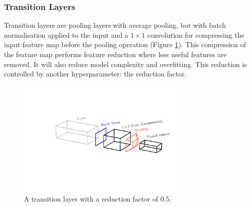 \subsubsection{Transition Layers}
Transition layers are pooling layers with average pooling, but with batch normalisation applied to the input and a $1\times{}1$ convolution for compressing the input feature map before the pooling operation (Figure \ref{fig:machine_learning:transition_layer}). 
This compression of the feature map performs feature reduction where less useful features are removed. It will also reduce model complexity and overfitting. This reduction is controlled by another hyperparameter: the reduction factor. 
\begin{figure}[h!]
    \includegraphics[width=0.75\textwidth]{figures/machine_learning/transition_layer.pdf}
    \caption{A transition layer with a reduction factor of 0.5.}
        \label{fig:machine_learning:transition_layer}
\end{figure}


